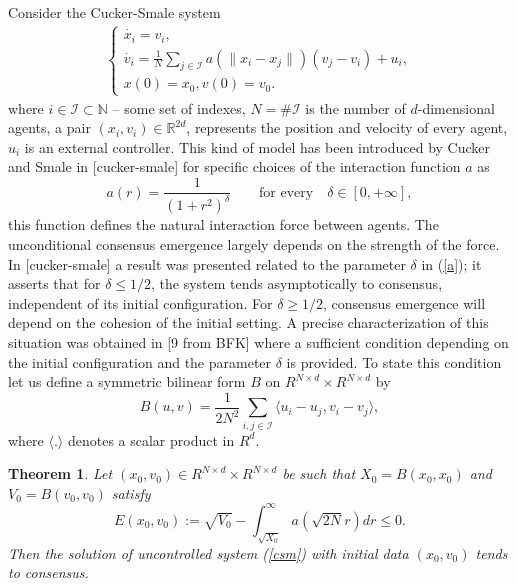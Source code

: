 \documentclass[a4paper,10pt, english]{article}
\newcommand{\D}{\displaystyle}
\newtheorem{theo}{Theorem}[section]
\begin{document}
Consider the Cucker-Smale system
\begin{align}
\begin{cases}
\D
\dot{x_i} = v_i,\\
\dot{v_i} = \frac{1}{N}\sum_{j\in \mathcal{I}}a(\|x_i - x_j\|)(v_j - v_i) + u_i, \\
x(0) = x_0,
v(0) = v_0.
\end{cases}
\label{csm}
\end{align}
where $i\in \mathcal{I} \subset \mathbb{N}$ \--- some set of indexes, $N = \# \mathcal{I}$ is the number of  $d$-dimensional agents, a pair $(x_i, v_i)\in \mathbb{R}^{2d}$, represents the position and velocity of every agent, $u_i$ is an external controller. This kind of model has been introduced by Cucker and Smale in [cucker-smale] for specific choices of the interaction function $a$ as
\begin{equation}
a(r) = \frac{1}{(1 + r^2)^\delta} \qquad \mbox{for every}\quad \delta \in [0, +\infty],
\label{a}
\end{equation}
this function defines the natural interaction force between agents. The unconditional consensus emergence largely depends on the strength of the force. In [cucker-smale] a result was presented related to the parameter $\delta$ in (\ref{a}); it asserts that for $\delta \leq 1/2$, the system tends asymptotically to consensus, independent of its initial configuration. For $\delta \geq 1/2$, consensus emergence will depend on the cohesion of the initial setting. A precise characterization of this situation was obtained in [9 from BFK] where a sufficient condition depending on the initial configuration and the parameter $\delta$ is provided. To state this condition let us define a symmetric bilinear form $B$ on $R^{N\times d} \times  R^{N\times d}$ by
\begin{equation}
B(u, v) = \frac{1}{2N^2}\sum_{i, j \in \mathcal{I}} \langle u_i - u_j, v_i - v_j  \rangle,
\label{b}
\end{equation}
where $\langle . \rangle$ denotes a scalar product in $R^d$.
\begin{theo}
Let $(x_0, v_0) \in R^{N\times d} \times  R^{N\times d}$ be such that $X_0 = B(x_0, x_0)$ and $V_0 = B(v_0, v_0)$ satisfy
$$
E(x_0, v_0):=\sqrt{V_0} - \int_{\sqrt{X_0}}^{\infty} a(\sqrt{2N}r)dr \leq 0.
$$
Then the solution of uncontrolled system (\ref{csm}) with initial data $(x_0, v_0)$  tends to consensus.
\end{theo}
\end{document}
